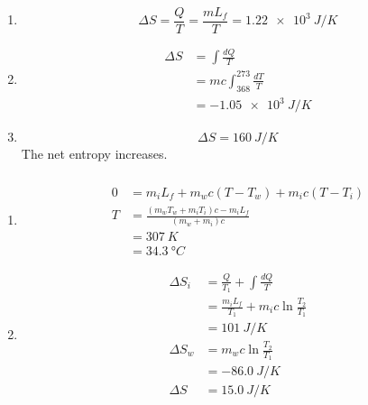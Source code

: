 \documentclass{article}
\begin{document}
\subsubsection{}

\begin{enumerate}
  \item \[\Delta S = \frac{Q}{T} = \frac{m L_f}{T} = \qty{1.22e3}{J/K}\]

  \item

        \begin{align*}
          \Delta S & = \int \frac{d Q}{T}                 \\
                   & = m c \int_{368}^{273} \frac{d T}{T} \\
                   & = \qty{-1.05e3}{J/K}
        \end{align*}

  \item \[\Delta S = \qty{160}{J/K}\] The net entropy increases.
\end{enumerate}

\subsubsection{}

\begin{enumerate}
  \item

        \begin{align*}
          0 & = m_i L_f + m_w c (T - T_w) + m_i c (T - T_i)           \\
          T & = \frac{(m_w T_w + m_i T_i) c - m_i L_f}{(m_w + m_i) c} \\
            & = \qty{307}{K}                                          \\
            & = \qty{34.3}{\degree C}
        \end{align*}

  \item

        \begin{align*}
          \Delta S_i & = \frac{Q}{T_1} + \int \frac{d Q}{T}              \\
                     & = \frac{m_i L_f}{T_1} + m_i c \ln \frac{T_2}{T_1} \\
                     & = \qty{101}{J/K}                                  \\
          \Delta S_w & = m_w c \ln \frac{T_2}{T_1}                       \\
                     & = \qty{-86.0}{J/K}                                \\
          \Delta S   & = \qty{15.0}{J/K}
        \end{align*}
\end{enumerate}
\end{document}
